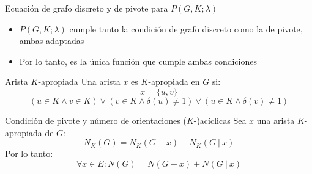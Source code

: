 \documentclass{beamer}
\begin{document}
\begin{frame}{Ecuación de grafo discreto y de pivote para $P(G, K; \lambda)$}
    \begin{itemize}
        \item<1-> $P(G, K; \lambda)$ cumple tanto la condición de grafo discreto como la de pivote, ambas adaptadas
        \item<2-> Por lo tanto, es la única función que cumple ambas condiciones
    \end{itemize}
\end{frame}

\begin{frame}{Arista $K$-apropiada}
    Una arista $x$ es $K$-apropiada en $G$ si:
    \begin{equation*}
        x = \{u, v\}
    \end{equation*}
    \begin{equation*}
        (u \in K \land v \in K) \lor (v \in K \land \delta(u) \neq 1) \lor (u \in K \land \delta(v) \neq 1)
    \end{equation*}
\end{frame}

\begin{frame}{Condición de pivote y número de orientaciones ($K$-)acíclicas}
    Sea $x$ una arista $K$-apropiada de $G$:
    \begin{equation*}
        N_K(G) = N_K(G - x) + N_K(G\ |\ x)
    \end{equation*}
    Por lo tanto:
    \begin{equation*}
        \forall x \in E : N(G) = N(G - x) + N(G\ |\ x)
    \end{equation*}
\end{frame}
\end{document}
